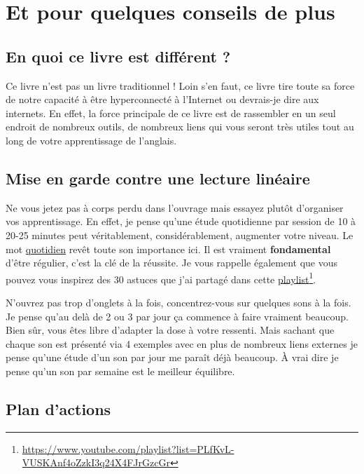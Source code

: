 \chapter{Et pour quelques conseils de plus}\label{chap:conseils}

\section{En quoi ce livre est différent ?}\label{sec:diff}

Ce livre n'est pas un livre traditionnel ! Loin s'en faut, ce livre
tire toute sa force de notre capacité à être hyperconnecté à
l'Internet ou devrais-je dire aux internets. En effet, la force
principale de ce livre est de rassembler en un seul endroit de
nombreux outils, de nombreux liens qui vous seront très utiles tout au
long de votre apprentissage de l'anglais.

\section{Mise en garde contre une lecture linéaire}\label{sec:lin}

Ne vous jetez pas à corps perdu dans l'ouvrage mais essayez plutôt
d'organiser vos apprentissage. En effet, je pense qu'une étude
quotidienne par session de 10 à 20-25 minutes peut véritablement,
considérablement, augmenter votre niveau. Le mot \underline{quotidien}
revêt toute son importance ici. Il est vraiment \textbf{fondamental}
d'être régulier, c'est la clé de la réussite. Je vous rappelle
également que vous pouvez vous inspirez des 30 astuces que j'ai
partagé dans cette \href{https://www.youtube.com/playlist?list=PLfKvL-VUSKAnf4oZzkI3q24X4FJrGzcGr}{playlist}\footnote{\url{https://www.youtube.com/playlist?list=PLfKvL-VUSKAnf4oZzkI3q24X4FJrGzcGr}}.

N'ouvrez pas trop d'onglets à la fois, concentrez-vous sur quelques
sons à la fois. Je pense qu'au delà de 2 ou 3 par jour ça commence à
faire vraiment beaucoup. Bien sûr, vous êtes libre d'adapter la dose à votre
ressenti. Mais sachant que chaque son est présenté via 4 exemples avec
en plus de nombreux liens externes je pense qu'une étude d'un son par
jour me paraît déjà beaucoup. À vrai dire je pense qu'un son par
semaine est le meilleur équilibre.

\section{Plan d'actions}\label{sec:plan}

